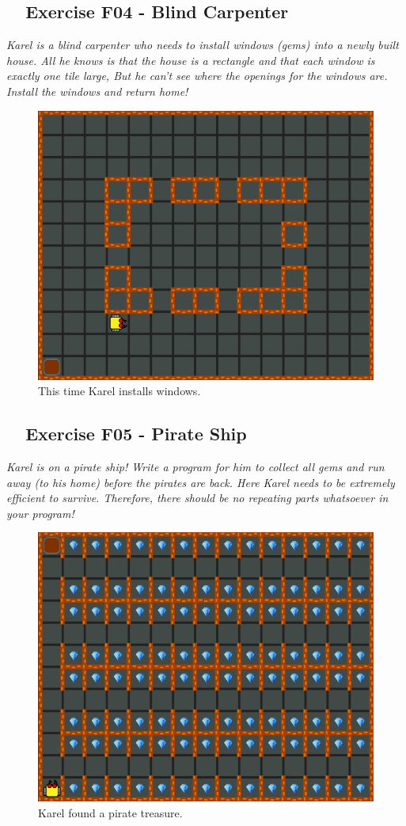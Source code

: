 \documentclass[article,A4,12pt]{llncs}
\begin{document}
{{{{\subsection{\ \ Exercise F04 - Blind Carpenter}

{\em Karel is a blind carpenter who needs to install windows (gems) into a newly built house. All he knows is that the house is a rectangle and that each window is exactly one tile large, But he can't see where the openings for the windows are. Install the windows and return home!}


\begin{figure}[!ht]
\begin{center}
\includegraphics[height=0.4\textwidth]{img/f04.png}
\end{center}
\vspace{-4mm}
\caption{This time Karel installs windows.}
\label{fig:f04}
\vspace{-10mm}
\end{figure}
\noindent
\newpage


\subsection{\ \ Exercise F05 - Pirate Ship}

{\em Karel is on a pirate ship! Write a program for him to collect all 
gems and run away (to his home) before the pirates are back. Here Karel 
needs to be extremely efficient to survive. Therefore, there should be 
no repeating parts whatsoever in your program!}


\begin{figure}[!ht]
\begin{center}
\includegraphics[height=0.4\textwidth]{img/f05.png}
\end{center}
\vspace{-4mm}
\caption{Karel found a pirate treasure.}
\label{fig:f05}
\vspace{-10mm}
\end{figure}
\noindent

}}}}
\end{document}
